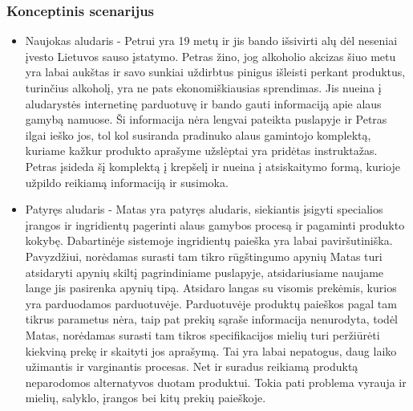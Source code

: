 \documentclass[oneside]{VUMIFPSkursinis}
\begin{document}
		\subsubsection{Konceptinis scenarijus}
			\begin{itemize}
				\item{Naujokas aludaris - Petrui yra 19 metų ir jis bando išsivirti alų dėl neseniai įvesto Lietuvos sauso įstatymo.
					Petras žino, jog alkoholio akcizas šiuo metu yra labai aukštas ir savo sunkiai uždirbtus pinigus išleisti perkant produktus, turinčius alkoholį, yra ne pats ekonomiškiausias sprendimas.
					Jis nueina į aludarystės internetinę parduotuvę ir bando gauti informaciją apie alaus gamybą namuose.
					Ši informacija nėra lengvai pateikta puslapyje ir Petras ilgai ieško jos, tol kol susiranda pradinuko alaus gamintojo komplektą, kuriame kažkur produkto aprašyme užslėptai yra pridėtas instruktažas.
					Petras įsideda šį komplektą į krepšelį ir nueina į atsiskaitymo formą, kurioje užpildo reikiamą informaciją ir susimoka.}
				\item{Patyręs aludaris - Matas yra patyręs aludaris, siekiantis įsigyti specialios įrangos ir ingridientų pagerinti alaus gamybos procesą ir pagaminti produkto kokybę.
					Dabartinėje sistemoje ingridientų paieška yra labai paviršutiniška.
					Pavyzdžiui, norėdamas surasti tam tikro rūgštingumo apynių Matas turi atsidaryti apynių skiltį pagrindiniame puslapyje, atsidariusiame naujame lange jis pasirenka apynių tipą.
					Atsidaro langas su visomis prekėmis, kurios yra parduodamos parduotuvėje.
					Parduotuvėje produktų paieškos pagal tam tikrus parametus nėra, taip pat prekių sąraše informacija nenurodyta, todėl Matas, norėdamas surasti tam tikros specifikacijos mielių turi peržiūrėti kiekviną prekę ir skaityti jos aprašymą.
					Tai yra labai nepatogus, daug laiko užimantis ir varginantis procesas.
					Net ir suradus reikiamą produktą neparodomos alternatyvos duotam produktui.
					Tokia pati problema vyrauja ir mielių, salyklo, įrangos bei kitų prekių paieškoje. }
			\end{itemize}
\end{document}
